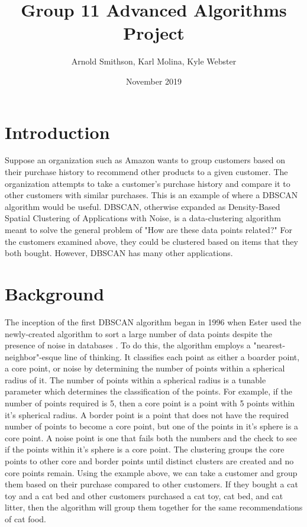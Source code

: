 \documentclass{article}
\title{Group 11 Advanced Algorithms Project}
\author{Arnold Smithson, Karl Molina, Kyle Webster}
\date{November 2019}
\begin{document}
\maketitle

\section{Introduction}

Suppose an organization such as Amazon wants to group customers based on their purchase history to recommend other products to a given customer. The organization attempts to take a customer's purchase history and compare it to other customers with similar purchases. This is an example of where a DBSCAN algorithm would be useful. DBSCAN, otherwise expanded as Density-Based Spatial Clustering of Applications with Noise, is a data-clustering algorithm meant to solve the general problem of "How are these data points related?" For the customers examined above, they could be clustered based on items that they both bought. However, DBSCAN has many other applications.

\section{Background}

The inception of the first DBSCAN algorithm began in 1996 when Ester used the newly-created algorithm to sort a large number of data points despite the presence of noise in databases \cite{ester1996density}. To do this, the algorithm employs a "nearest-neighbor"-esque line of thinking. It classifies each point as either a boarder point, a core point, or noise by determining the number of points within a spherical radius of it. The number of points within a spherical radius is a tunable parameter which determines the classification of the points. For example, if the number of points required is 5, then a core point is a point with 5 points within it's spherical radius. A border point is a point that does not have the required number of points to become a core point, but one of the points in it's sphere is a core point. A noise point is one that fails both the numbers and the check to see if the points within it's sphere is a core point. The clustering groups the core points to other core and border points until distinct clusters are created and no core points remain. Using the example above, we can take a customer and group them based on their purchase compared to other customers. If they bought a cat toy and a cat bed and other customers purchased a cat toy, cat bed, and cat litter, then the algorithm will group them together for the same recommendations of cat food. 
\end{document}
